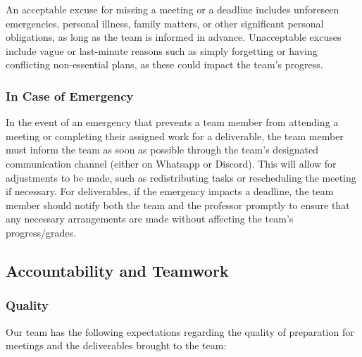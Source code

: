 \documentclass{article}
\begin{document}
An acceptable excuse for missing a meeting or a deadline includes unforeseen emergencies, personal 
illness, family matters, or other significant personal obligations, as long as the team is 
informed in advance. Unacceptable excuses include vague or last-minute reasons such as simply 
forgetting or having conflicting non-essential plans, as these could impact the team's progress.

\subsubsection*{In Case of Emergency}

In the event of an emergency that prevents a team member from attending a meeting or completing 
their assigned work for a deliverable, the team member must inform the team as soon as possible 
through the team's designated communication channel (either on Whatsapp or Discord). This will 
allow for adjustments to be made, such as redistributing tasks or rescheduling the meeting if 
necessary. For deliverables, if the emergency impacts a deadline, the team member should notify 
both the team and the professor promptly to ensure that any necessary arrangements are made 
without affecting the team's progress/grades.

\subsection*{Accountability and Teamwork}

\subsubsection*{Quality}

Our team has the following expectations regarding the quality of preparation for meetings and the deliverables brought to the team:
\end{document}
